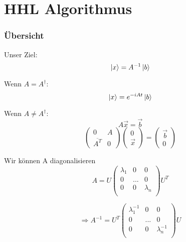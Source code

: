 \section{HHL Algorithmus}


\begin{frame}
\frametitle{Übersicht}

Unser Ziel:
$$\ket{x} = A^{-1}\ket{b}$$

Wenn $A=A^\dagger$: 
$$\ket{x} = e^{-iAt} \ket{b}$$

Wenn $A\neq A^\dagger$: 
    $$A \vec{x} = \vec{b}$$
    $$\begin{pmatrix} 0 & A \\ \overline {A^T} & 0 \end{pmatrix} 
    \begin{pmatrix} 0 \\ \vec{x}  \end{pmatrix}
    =
    \begin{pmatrix} \vec{b} \\ 0 \end{pmatrix} $$

Wir können A diagonalisieren
    $$A = U \begin{pmatrix} \lambda_1 & 0 & 0\\ 0 & ... & 0\\ 0 & 0& \lambda_n \\ \end{pmatrix} U^T$$

    $$ \Rightarrow A^{-1}=  U^T 
    \begin{pmatrix} \lambda_1^{-1} & 0 & 0\\ 0 & ... & 0\\ 0 & 0& \lambda_n^{-1} \\ \end{pmatrix}
    U$$

\end{frame}




